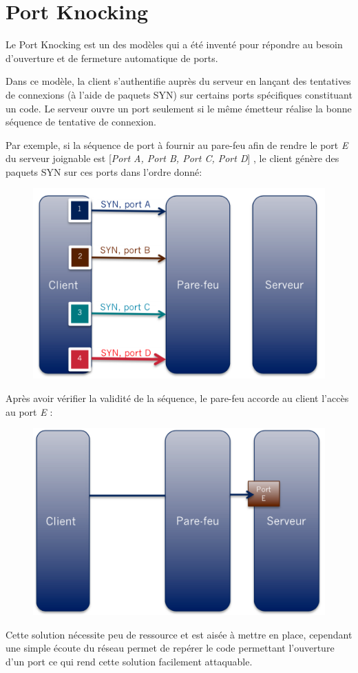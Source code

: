 \chapter{Port Knocking}

Le Port Knocking est un des modèles qui a été inventé pour répondre au besoin d'ouverture et de fermeture automatique de ports.

Dans ce modèle, la client s'authentifie auprès du serveur en lançant des tentatives de connexions (à l'aide de paquets SYN) sur certains ports spécifiques constituant un code. Le serveur ouvre un port seulement si le même émetteur réalise la bonne séquence de tentative de connexion.

Par exemple, si la séquence de port à fournir au pare-feu afin de rendre le port \emph{E} du serveur joignable est [\emph{Port A, Port B, Port C, Port D}] , le client génère des paquets SYN sur ces ports dans l'ordre donné:
\begin{figure}[h]

\centerline{\includegraphics[scale=0.4]{portknocking1}}

\end{figure}

Après avoir vérifier la validité de la séquence, le pare-feu accorde au client l'accès au port \emph{E} : 

\begin{figure}[h]

\centerline{\includegraphics[scale=0.4]{portknocking2}}

\end{figure}

Cette solution nécessite peu de ressource et est aisée à mettre en place, cependant une simple écoute du réseau permet de repérer le code permettant l'ouverture d'un port ce qui rend cette solution facilement attaquable.